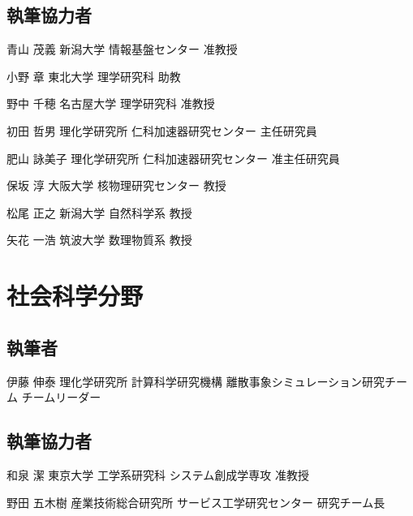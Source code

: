 \begin{執筆者一覧}
\subsection{執筆協力者}
\item
{青山 茂義}
{新潟大学 情報基盤センター}
{准教授}
\item
{小野 章}
{東北大学 理学研究科}
{助教}
\item
{野中 千穂}
{名古屋大学 理学研究科}
{准教授}
\item
{初田 哲男}
{理化学研究所 仁科加速器研究センター}
{主任研究員}
\item
{肥山 詠美子}
{理化学研究所 仁科加速器研究センター}
{准主任研究員}
\item
{保坂 淳}
{大阪大学 核物理研究センター}
{教授}
\item
{松尾 正之}
{新潟大学 自然科学系}
{教授}
\item
{矢花 一浩}
{筑波大学 数理物質系}
{教授}
\section{社会科学分野}
\subsection{執筆者}
\item
{伊藤 伸泰}
{理化学研究所 計算科学研究機構 離散事象シミュレーション研究チーム}
{チームリーダー}
\subsection{執筆協力者}
\item
{和泉 潔}
{東京大学 工学系研究科 システム創成学専攻}
{准教授}
\item
{野田 五木樹}
{産業技術総合研究所 サービス工学研究センター}
{研究チーム長}
\end{執筆者一覧}


\clearpage
